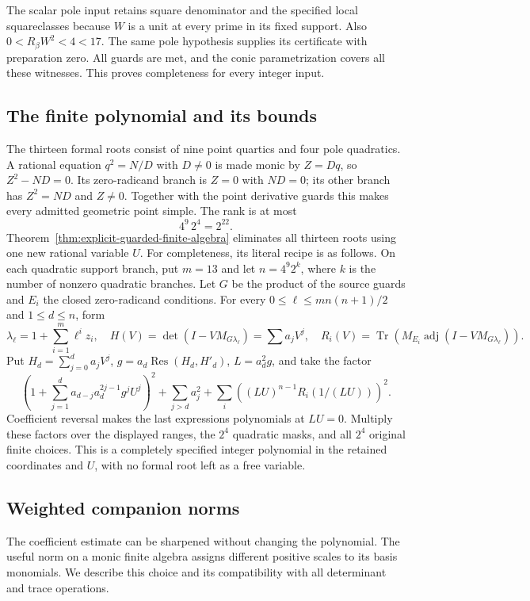 \documentclass[11pt,a4paper]{article}
\theoremstyle{definition}
\theoremstyle{remark}
\begin{document}
The scalar pole input retains square denominator and the specified
local squareclasses because $W$ is a unit at every prime in its fixed
support.  Also $0<R_\beta W^2<4<17$.  The same pole hypothesis
supplies its certificate with preparation zero.  All guards are met,
and the conic parametrization covers all these witnesses.  This proves
completeness for every integer input.

\subsection{The finite polynomial and its bounds}

The thirteen formal roots consist of nine point quartics and four
pole quadratics.  A rational equation $q^2=N/D$ with $D\ne0$ is
made monic by $Z=Dq$, so $Z^2-ND=0$.  Its zero-radicand branch is
$Z=0$ with $ND=0$; its other branch has $Z^2=ND$ and $Z\ne0$.
Together with the point derivative guards this makes every admitted
geometric point simple.  The rank is at most
\[
                              4^9\,2^4=2^{22}.
\]
Theorem~\ref{thm:explicit-guarded-finite-algebra} eliminates all thirteen
roots using one new rational variable $U$.  For completeness, its
literal recipe is as follows.  On each quadratic support branch,
put $m=13$ and let $n=4^9 2^k$, where $k$ is the number of nonzero
quadratic branches.  Let $G$ be the product of the source guards and $E_i$ the closed
zero-radicand conditions.  For every
$0\le\ell\le mn(n+1)/2$ and $1\le d\le n$, form
\[
 \lambda_\ell=1+\sum_{i=1}^m\ell^iz_i,\quad
 H(V)=\det(I-VM_{G\lambda_\ell})=\sum a_jV^j,
 \quad R_i(V)=\operatorname{Tr}(M_{E_i}\operatorname{adj}(I-VM_{G\lambda_\ell})).
\]
Put $H_d=\sum_{j=0}^d a_jV^j$,
$g=a_d\operatorname{Res}(H_d,H'_d)$, $L=a_d^2g$, and take the factor
\[
 \left(1+\sum_{j=1}^d a_{d-j}a_d^{2j-1}g^jU^j\right)^2
       +\sum_{j>d}a_j^2
       +\sum_i\left((LU)^{n-1}R_i(1/(LU))\right)^2.
\]
Coefficient reversal makes the last expressions polynomials at
$LU=0$.  Multiply these factors over the displayed ranges, the
$2^4$ quadratic masks, and all $2^4$ original finite choices.
This is a completely specified integer polynomial in the retained
coordinates and $U$, with no formal root left as a free variable.

\subsection{Weighted companion norms}
\label{subsec:weighted-companion-norms}

The coefficient estimate can be sharpened without changing the
polynomial. The useful norm on a monic finite algebra assigns different
positive scales to its basis monomials. We describe this choice and its
compatibility with all determinant and trace operations.
\end{document}
